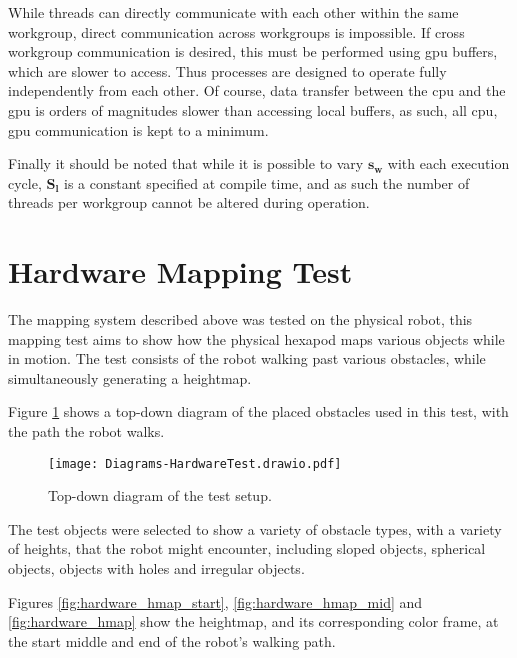            While threads can directly communicate with each other within the same workgroup, direct communication across workgroups is
            impossible. If cross workgroup communication is desired, this must be performed using \ac{gpu} buffers, which are slower to access. Thus processes are
            designed to operate fully independently from each other. Of course, data transfer between the \ac{cpu} and the \ac{gpu} is orders of magnitudes
            slower than accessing local buffers, as such, all \ac{cpu}, \ac{gpu} communication is kept to a minimum.
            
            Finally it should be noted that while it is possible to vary \(\bm{s_w}\) with each execution cycle, \(\bm{S_l}\) is a constant specified at compile time,
            and as such the number of threads per workgroup cannot be altered during operation.

    \newpage
    \section{Hardware Mapping Test}
        The mapping system described above was tested on the physical robot, this mapping test aims to show how the physical hexapod maps various objects while in motion.
        The test consists of the robot walking past various obstacles, while simultaneously generating a heightmap.

        Figure \ref{fig:hardware_map_diag} shows a top-down diagram of the placed obstacles used in this test, with the path the robot walks.
        \begin{figure}[h]
            \centering
            \texttt{[image: Diagrams-HardwareTest.drawio.pdf]}
            \caption{Top-down diagram of the test setup.}
            \label{fig:hardware_map_diag}
        \end{figure}

        \noindent
        The test objects were selected to show a variety of obstacle types, with a variety of heights, that the robot might encounter, including sloped objects, spherical objects, objects
        with holes and irregular objects. 

        Figures \ref{fig:hardware_hmap_start}, \ref{fig:hardware_hmap_mid} and \ref{fig:hardware_hmap} show the heightmap, and its corresponding color frame, at the start middle and end of the
        robot's walking path.
        
